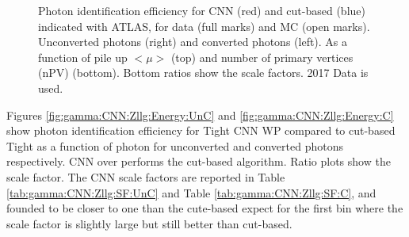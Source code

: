\begin{figure}[htbp]
	\begin{tcolorbox}[colback=black!5!white,colframe=white!75!black]
    \caption{Photon identification efficiency for CNN (red) and cut-based (blue) indicated with ATLAS, for data (full marks) and MC (open marks). Unconverted photons (right) and converted photons (left). As a function of pile up $<\mu>$ (top) and number of primary vertices (nPV) (bottom). Bottom ratios show the scale factors. 2017 Data is used.}
    \label{fig:gamma:CNN:Zllg:MU}
    \end{tcolorbox}
    
\end{figure}
Figures \ref{fig:gamma:CNN:Zllg:Energy:UnC} and \ref{fig:gamma:CNN:Zllg:Energy:C} show photon identification efficiency for Tight CNN WP compared to cut-based Tight as a function of photon \eT for unconverted and converted photons respectively. CNN over performs the cut-based algorithm. Ratio plots show the scale factor. The CNN scale factors are reported in Table \ref{tab:gamma:CNN:Zllg:SF:UnC} and Table \ref{tab:gamma:CNN:Zllg:SF:C}, and founded to be closer to one than the cute-based expect for the first \eT bin where the scale factor is slightly large but still better than cut-based. 
